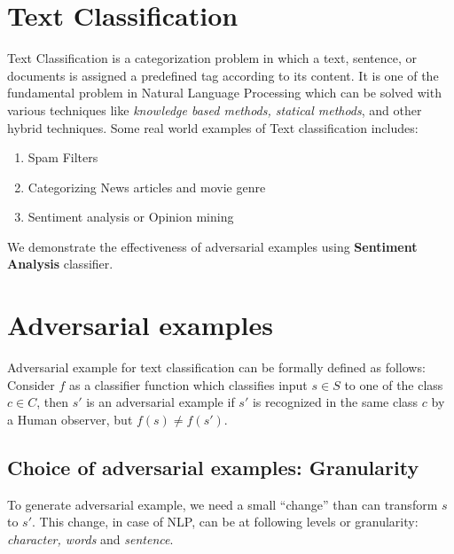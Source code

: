 \documentclass[12pt]{report}
\begin{document}
\begin{spacing}{1.5}
\section{Text Classification}
Text Classification is a categorization problem in which a text, sentence, or documents is assigned a predefined tag according to its content. It is one of the fundamental problem in Natural Language Processing which can be solved with various techniques like \textit{knowledge based methods, statical methods}, and other hybrid techniques.
Some real world examples of Text classification includes:
\begin{enumerate}
\item Spam Filters
\item Categorizing News articles and movie genre
\item Sentiment analysis or Opinion mining
\end{enumerate}
We demonstrate the effectiveness of adversarial examples using \textbf{Sentiment Analysis} classifier.

\section{Adversarial examples}

Adversarial example for text classification can be formally defined as follows:
Consider $f$ as a classifier function which classifies input $s \in S$ to one of the class $c \in C$, then $s'$ is an adversarial example if $s'$ is recognized in the same class $c$ by a Human observer, but $f(s) \neq f(s')$.

\subsection{Choice of adversarial examples: Granularity}
To generate adversarial example, we need a small ``change'' than can transform $s$ to $s'$. This change, in case of NLP, can be at following levels or granularity: \textit{character, words} and \textit{ sentence}.

\end{spacing}
\end{document}
